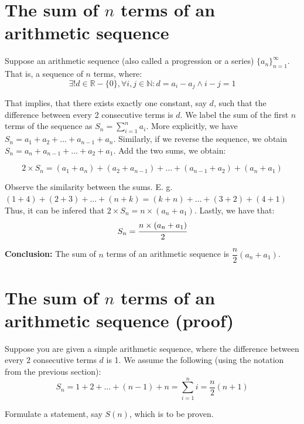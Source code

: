 \documentclass[10pt,a4paper]{article}
\begin{document}

\newpage

\section*{The sum of $n$ terms of an arithmetic sequence}

Suppose an arithmetic sequence (also called a progression or a series) $\{a_{n}\}_{n=1}^{\infty}$. That is, a sequence of $n$ terms, where:
$$\exists! d \in \mathbb{R} - \{0\}, \forall i,j \in \mathbb{N}: d = a_{i} - a_{j} \land i - j = 1$$ 

That implies, that there exists exactly one constant, say $d$, such that the difference between every 2
consecutive terms is $d$. We label the sum of the first $n$ terms of the sequence as $S_{n}=\sum_{i=1}^n a_{i}$.
More explicitly, we have $S_{n} = a_{1} + a_{2} + \dots + a_{n-1} + a_{n}$. Similarly, if we reverse the 
sequence, we obtain $S_{n} = a_{n} + a_{n-1} + \dots + a_{2} + a_{1}$. Add the two sums, we obtain:

$$2 \times S_{n} = (a_{1} + a_{n}) + (a_{2} + a_{n-1}) + \dots + (a_{n-1} + a_{2}) + (a_{n} + a_{1})$$

Observe the similarity between the sums. E. g.
$(1 + 4) + (2 + 3) + \dots + (n + k) = (k + n) + \dots + (3 + 2) + (4 + 1)$
Thus, it can be infered that $2 \times S_{n} = n \times (a_{n} + a_{1})$.
Lastly, we have that: $$S_{n} = \cfrac{n \times (a_{n} + a_{1})}{2}$$

\textbf{Conclusion:} The sum of $n$ terms of an arithmetic sequence is $\dfrac{n}{2} (a_{n} + a_{1})$.



\section*{The sum of $n$ terms of an arithmetic sequence (proof)}

Suppose you are given a simple arithmetic sequence, where the difference between every 2 consecutive terms 
$d$ is 1. We assume the following (using the notation from the previous section): 
$$S_{n} = 1 + 2 + \dots + (n - 1) + n = \sum_{i=1}^{n} i = \frac{n}{2} (n + 1)$$

Formulate a statement, say $S(n)$, which is to be proven.
\end{document}
